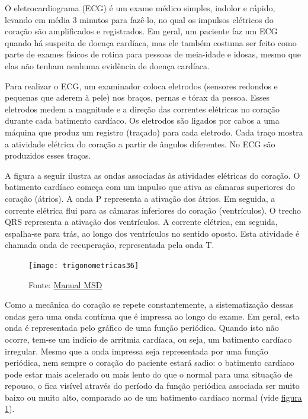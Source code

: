 \needspace{10em}
\begin{knowledge}
O eletrocardiograma (ECG) é um exame médico simples, indolor e rápido, levando em média 3 minutos para fazê-lo, no qual os impulsos elétricos do coração são amplificados e registrados. Em geral, um paciente faz um ECG quando há suspeita de doença cardíaca, mas ele também costuma ser feito como parte de exames físicos de rotina para pessoas de meia-idade e idosas, mesmo que elas não tenham nenhuma evidência de doença cardíaca.

Para realizar o ECG, um examinador coloca eletrodos (sensores redondos e pequenas que aderem à pele) nos braços, pernas e tórax da pessoa. Esses eletrodos medem a magnitude e a direção das correntes elétricas no coração durante cada batimento cardíaco. Os eletrodos são ligados por cabos a uma máquina que produz um registro (traçado) para cada eletrodo. Cada traço mostra a atividade elétrica do coração a partir de ângulos diferentes. No ECG são produzidos esses traços.

A figura a seguir ilustra as ondas associadas às atividades elétricas do coração. O batimento cardíaco começa com um impulso que ativa as câmaras superiores do coração (átrios). A onda P representa a ativação dos átrios. Em seguida, a corrente elétrica flui para as câmaras inferiores do coração (ventrículos). O trecho QRS representa a ativação dos ventrículos. A corrente elétrica, em seguida, espalha-se para trás, ao longo dos ventrículos no sentido oposto. Esta atividade é chamada onda de recuperação, representada pela onda T.



\begin{figure}[H]
\centering

\texttt{[image: trigonometricas36]}
\caption{Fonte: \href{https://www.msdmanuals.com/pt/casa/dist\%C3\%BArbios-do-cora\%C3\%A7\%C3\%A3o-e-dos-vasos-sangu\%C3\%ADneos/diagn\%C3\%B3stico-de-dist\%C3\%BArbios-do-cora\%C3\%A7\%C3\%A3o-e-dos-vasos-sangu\%C3\%ADneos/eletrocardiograma}{Manual MSD}}
\label{eletrocardiograma}
\end{figure}

Como a mecânica do coração se repete constantemente, a sistematização dessas ondas gera uma onda contínua que é impressa ao longo do exame. Em geral, esta onda é representada pelo gráfico de uma função periódica. Quando isto não ocorre, tem-se um indício de arritmia cardíaca, ou seja, um batimento cardíaco irregular.
Mesmo que a onda impressa seja representada por uma função periódica, nem sempre o coração do paciente estará sadio: o batimento cardíaco pode estar mais acelerado ou mais lento do que o normal para uma situação de repouso, o fica visível através do período da função periódica associada ser muito baixo ou muito alto, comparado ao de um batimento cardíaco normal (vide \hyperref[eletrocardiograma]{figura \ref{eletrocardiograma}}).


\end{knowledge}

